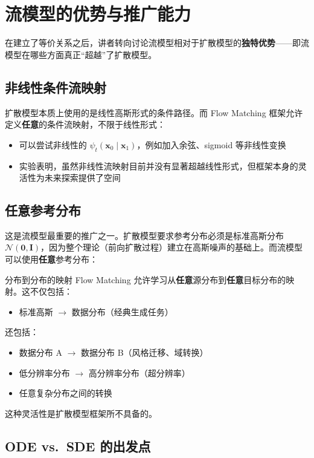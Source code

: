 \section{流模型的优势与推广能力}

在建立了等价关系之后，讲者转向讨论流模型相对于扩散模型的\textbf{独特优势}——即流模型在哪些方面真正``超越''了扩散模型。

\subsection{非线性条件流映射}

扩散模型本质上使用的是线性高斯形式的条件路径。而 Flow Matching 框架允许定义\textbf{任意}的条件流映射，不限于线性形式：

\begin{itemize}
    \item 可以尝试非线性的 $\psi_t(\mathbf{x}_0 \mid \mathbf{x}_1)$，例如加入余弦、sigmoid 等非线性变换
    \item 实验表明，虽然非线性流映射目前并没有显著超越线性形式，但框架本身的灵活性为未来探索提供了空间
\end{itemize}

\subsection{任意参考分布}

这是流模型最重要的推广之一。扩散模型要求参考分布必须是标准高斯分布 $\mathcal{N}(\mathbf{0}, \mathbf{I})$，因为整个理论（前向扩散过程）建立在高斯噪声的基础上。而流模型可以使用\textbf{任意}参考分布：

\begin{importantbox}{分布到分布的映射}
Flow Matching 允许学习从\textbf{任意}源分布到\textbf{任意}目标分布的映射。这不仅包括：
\begin{itemize}
    \item 标准高斯 $\to$ 数据分布（经典生成任务）
\end{itemize}
还包括：
\begin{itemize}
    \item 数据分布 A $\to$ 数据分布 B（风格迁移、域转换）
    \item 低分辨率分布 $\to$ 高分辨率分布（超分辨率）
    \item 任意复杂分布之间的转换
\end{itemize}
这种灵活性是扩散模型框架所不具备的。
\end{importantbox}

\subsection{ODE vs.\ SDE 的出发点}

